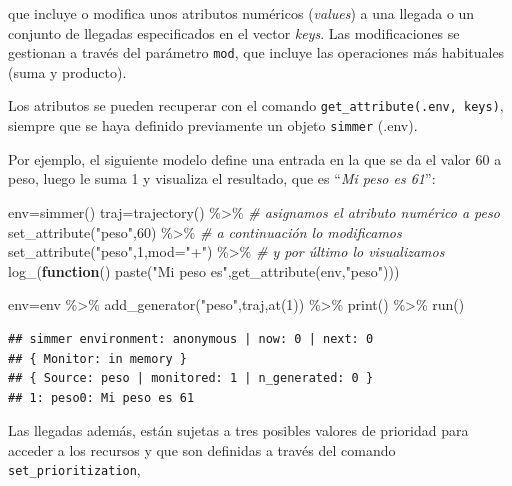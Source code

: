 \documentclass[
]{book}
\newenvironment{Shaded}{\begin{snugshade}}{\end{snugshade}}
\newcommand{\AttributeTok}[1]{\textcolor[rgb]{0.77,0.63,0.00}{#1}}
\newcommand{\CommentTok}[1]{\textcolor[rgb]{0.56,0.35,0.01}{\textit{#1}}}
\newcommand{\ControlFlowTok}[1]{\textcolor[rgb]{0.13,0.29,0.53}{\textbf{#1}}}
\newcommand{\DecValTok}[1]{\textcolor[rgb]{0.00,0.00,0.81}{#1}}
\newcommand{\FunctionTok}[1]{\textcolor[rgb]{0.00,0.00,0.00}{#1}}
\newcommand{\NormalTok}[1]{#1}
\newcommand{\OtherTok}[1]{\textcolor[rgb]{0.56,0.35,0.01}{#1}}
\newcommand{\SpecialCharTok}[1]{\textcolor[rgb]{0.00,0.00,0.00}{#1}}
\newcommand{\StringTok}[1]{\textcolor[rgb]{0.31,0.60,0.02}{#1}}
\theoremstyle{definition}
\theoremstyle{definition}
\theoremstyle{definition}
\theoremstyle{definition}
\theoremstyle{remark}
\begin{document}
que incluye o modifica unos atributos numéricos (\emph{values}) a una llegada o un conjunto de llegadas especificados en el vector \emph{keys}. Las modificaciones se gestionan a través del parámetro \texttt{mod}, que incluye las operaciones más habituales (suma y producto).

Los atributos se pueden recuperar con el comando \texttt{get\_attribute(.env,\ keys)}, siempre que se haya definido previamente un objeto \texttt{simmer} (.env).

Por ejemplo, el siguiente modelo define una entrada en la que se da el valor 60 a peso, luego le suma 1 y visualiza el resultado, que es ``\emph{Mi peso es 61}'':

\begin{Shaded}
\begin{Highlighting}[]
\NormalTok{env}\OtherTok{=}\FunctionTok{simmer}\NormalTok{()}
\NormalTok{traj}\OtherTok{=}\FunctionTok{trajectory}\NormalTok{() }\SpecialCharTok{\%\textgreater{}\%}
  \CommentTok{\# asignamos el atributo numérico a peso}
  \FunctionTok{set\_attribute}\NormalTok{(}\StringTok{"peso"}\NormalTok{,}\DecValTok{60}\NormalTok{) }\SpecialCharTok{\%\textgreater{}\%}
  \CommentTok{\# a continuación lo modificamos}
  \FunctionTok{set\_attribute}\NormalTok{(}\StringTok{"peso"}\NormalTok{,}\DecValTok{1}\NormalTok{,}\AttributeTok{mod=}\StringTok{"+"}\NormalTok{) }\SpecialCharTok{\%\textgreater{}\%}
  \CommentTok{\# y por último lo visualizamos}
  \FunctionTok{log\_}\NormalTok{(}\ControlFlowTok{function}\NormalTok{() }\FunctionTok{paste}\NormalTok{(}\StringTok{"Mi peso es"}\NormalTok{,}\FunctionTok{get\_attribute}\NormalTok{(env,}\StringTok{"peso"}\NormalTok{)))}

\NormalTok{env}\OtherTok{=}\NormalTok{env }\SpecialCharTok{\%\textgreater{}\%}
  \FunctionTok{add\_generator}\NormalTok{(}\StringTok{"peso"}\NormalTok{,traj,}\FunctionTok{at}\NormalTok{(}\DecValTok{1}\NormalTok{)) }\SpecialCharTok{\%\textgreater{}\%}
  \FunctionTok{print}\NormalTok{() }\SpecialCharTok{\%\textgreater{}\%}
  \FunctionTok{run}\NormalTok{()}
\end{Highlighting}
\end{Shaded}

\begin{verbatim}
## simmer environment: anonymous | now: 0 | next: 0
## { Monitor: in memory }
## { Source: peso | monitored: 1 | n_generated: 0 }
## 1: peso0: Mi peso es 61
\end{verbatim}

Las llegadas además, están sujetas a tres posibles valores de prioridad para acceder a los recursos y que son definidas a través del comando \texttt{set\_prioritization},
\end{document}
